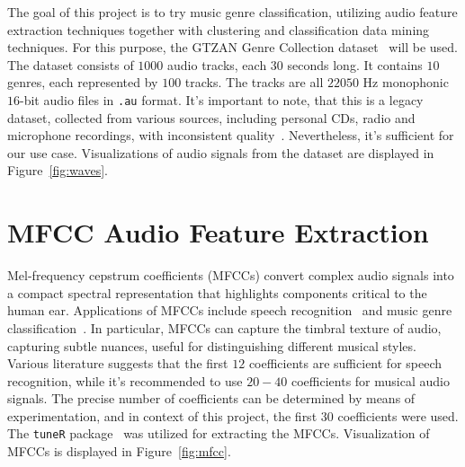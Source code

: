\documentclass[twocolumn]{article}
\begin{document}
The goal of this project is to try music genre classification, utilizing audio feature extraction techniques together with clustering and classification data mining techniques. For this purpose, the GTZAN Genre Collection dataset~\cite{tzanetakis_essl_cook_2001} will be used. The dataset consists of $1000$ audio tracks, each $30$ seconds long. It contains $10$ genres, each represented by $100$ tracks. The tracks are all $22050$ Hz monophonic $16$-bit audio files in \texttt{.au} format. It's important to note, that this is a legacy dataset, collected from various sources, including personal CDs, radio and microphone recordings, with inconsistent quality~\cite{sturm2013gtzan}. Nevertheless, it's sufficient for our use case. Visualizations of audio signals from the dataset are displayed in Figure~\ref{fig:waves}.
\section{MFCC Audio Feature Extraction}
Mel-frequency cepstrum coefficients (MFCCs) convert complex audio signals into a compact spectral representation that highlights components critical to the human ear. Applications of MFCCs include speech recognition~\cite{ganchev2005comparative} and music genre classification~\cite{lerch2012introduction}. In particular, MFCCs can capture the timbral texture of audio, capturing subtle nuances, useful for distinguishing different musical styles. Various literature suggests that the first $12$ coefficients are sufficient for speech recognition, while it's recommended to use $20-40$ coefficients for musical audio signals. The precise number of coefficients can be determined by means of experimentation, and in context of this project, the first $30$ coefficients were used. The \texttt{tuneR} package~\cite{tuneR} was utilized for extracting the MFCCs. Visualization of MFCCs is displayed in Figure~\ref{fig:mfcc}.
\end{document}
